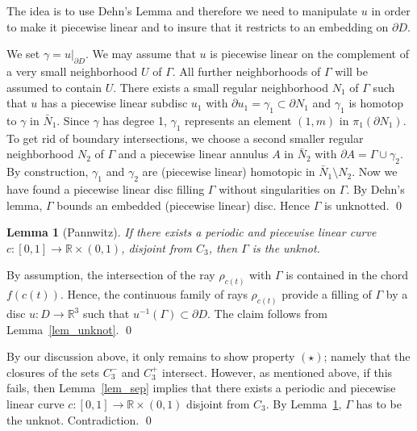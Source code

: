 \documentclass[a4paper,12pt]{amsart}
\numberwithin{equation}{section}
\def\D{\partial}
\def\R{\mathbb R}
\def\ga{\gamma}
\def\Ga{\Gamma}
\theoremstyle{plain}
\newtheorem{lem}[thm]{Lemma}
\theoremstyle{named}
\theoremstyle{definition}
\theoremstyle{remark}
\newcommand{\blem}{\begin{lem}}
\newcommand{\elem}{\end{lem}}
\begin{document}
\proof
The idea is to use Dehn's Lemma and therefore we need to manipulate $u$ in order to make it piecewise linear and to insure that it restricts to an embedding on 
$\D D$.

We set $\ga=u|_{\D D}$.
We may assume that $u$ is piecewise linear on the complement of a very small neighborhood $U$ of $\Ga$. 
All further neighborhoods of $\Ga$ will be assumed to contain $U$.
There exists a small regular neighborhood $N_1$ of $\Ga$ such that $u$ has a piecewise linear subdisc $u_1$
with $\D u_1=\ga_1\subset\D N_1$ and $\ga_1$ is  homotop to $\ga$ in $\bar N_1$. Since $\ga$ has degree 1,
$\ga_1$ represents an element $(1,m)$ in $\pi_1(\D N_1)$. To get rid of boundary intersections, we choose a second smaller regular neighborhood
$N_2$ of $\Ga$ and a piecewise linear annulus $A$ in $\bar N_2$ with $\D A=\Ga\cup\ga_2$.
By construction, $\ga_1$ and $\ga_2$ are (piecewise linear) homotopic in $\bar N_1\setminus N_2$.
Now we have found a piecewise linear disc filling $\Ga$ without singularities on $\Ga$.
By Dehn's lemma, $\Ga$ bounds an embedded (piecewise linear) disc. Hence $\Ga$ is unknotted.
\qed

\blem[Pannwitz]\label{lem_pannwitz}
If there exists a periodic and piecewise linear curve $c:[0,1]\to\R\times(0,1)$, disjoint from $C_3$, then
$\Ga$ is the unknot.
\elem

\proof
By assumption, the intersection of the ray $\rho_{c(t)}$ with $\Ga$ is contained in the chord $f(c(t))$.
Hence, the continuous family of rays $\rho_{c(t)}$ provide a filling of $\Ga$ by
a disc $u:D\to \R^3$ such that $u^{-1}(\Ga)\subset\D D$. The claim follows from Lemma~\ref{lem_unknot}.
\qed

By our discussion above, it only remains to show property $(\star)$; namely that
the closures of the sets $C_3^-$ and $C_3^+$ intersect.  
However, as mentioned above, if this fails, then Lemma~\ref{lem_sep} implies that 
there exists a periodic and piecewise linear curve $c:[0,1]\to\R\times(0,1)$ disjoint from $C_3$.
By Lemma~\ref{lem_pannwitz}, $\Ga$ has to be the unknot. Contradiction.
\qed




\end{document}

